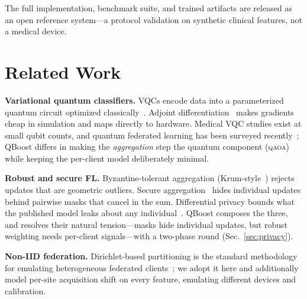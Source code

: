 \documentclass[conference]{IEEEtran}
\newcommand{\qaoa}{\textsc{qaoa}}
\begin{document}
The full implementation, benchmark suite, and trained artifacts are released
as an open reference system---a protocol validation on synthetic clinical
features, not a medical device.

\section{Related Work}
\textbf{Variational quantum classifiers.} VQCs encode data into a
parameterized quantum circuit optimized classically~\cite{havlicek,cerezo}.
Adjoint differentiation~\cite{jones} makes gradients cheap in simulation and
maps directly to hardware. Medical VQC studies exist at small qubit counts,
and quantum federated learning has been surveyed recently~\cite{nguyen_qfl};
QBoost differs in making the \emph{aggregation} step the quantum component
(\qaoa{}) while keeping the per-client model deliberately minimal.

\textbf{Robust and secure FL.} Byzantine-tolerant aggregation
(Krum-style~\cite{blanchard}) rejects updates that are geometric outliers.
Secure aggregation~\cite{bonawitz} hides individual updates behind pairwise
masks that cancel in the sum. Differential privacy bounds what the published
model leaks about any individual~\cite{abadi,dwork}. QBoost composes the
three, and resolves their natural tension---masks hide individual updates,
but robust weighting needs per-client signals---with a two-phase round
(Sec.~\ref{sec:privacy}).

\textbf{Non-IID federation.} Dirichlet-based partitioning is the standard
methodology for emulating heterogeneous federated clients~\cite{hsu}; we
adopt it here and additionally model per-site acquisition shift on every
feature, emulating different devices and calibration.
\end{document}
